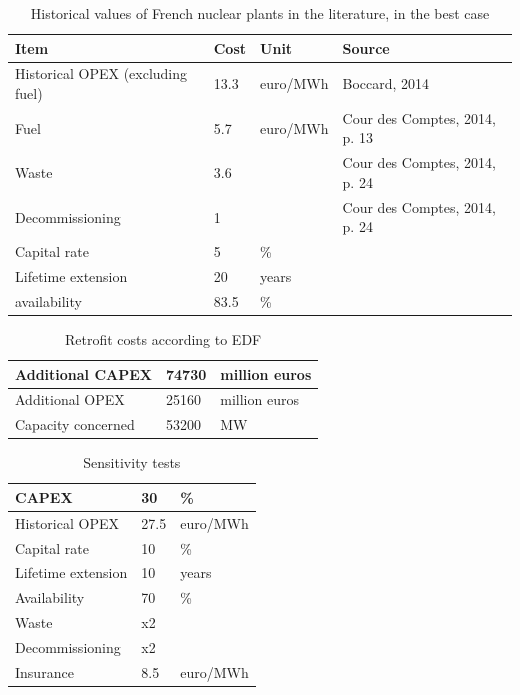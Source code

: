 \begin{table}[!htp]
	\centering
	\caption{Historical values of French nuclear plants in the literature, in the best case}
	\label{tab:historical_costs}
	\begin{tabular}{llll}
		\toprule
		Item & Cost & Unit & Source \\
		\midrule
		Historical OPEX (excluding fuel) & 13.3 & euro/MWh & Boccard, 2014 \\
		Fuel & 5.7 & euro/MWh & Cour des Comptes, 2014, p. 13 \\
		Waste & 3.6 &  & Cour des Comptes, 2014, p. 24 \\
		Decommissioning & 1 &  & Cour des Comptes, 2014, p. 24 \\
		Capital rate & 5 & \% &  \\
		Lifetime extension & 20 & years & \\
		availability & 83.5 & \% & \\
		\bottomrule
	\end{tabular}
\end{table}


\begin{table}[!htp]
	\centering
	\caption{Retrofit costs according to EDF}
	\label{tab:costs_grand_carenage}
	\begin{tabular}{lll}
		\toprule
		Additional CAPEX & 74730 & million euros \\
		\midrule
		Additional OPEX & 25160 & million euros \\
		Capacity concerned & 53200 & MW \\
		\bottomrule
	\end{tabular}
\end{table}


\begin{table}[!htp]
	\centering
	\caption{Sensitivity tests}
	\label{tab:sensitivity_tests}
	\begin{tabular}{lll}
		\toprule
		CAPEX & 30 & \% \\
		\midrule
		Historical OPEX & 27.5 & euro/MWh \\
		Capital rate & 10 & \% \\
		Lifetime extension & 10 & years \\
		Availability & 70 & \% \\
		Waste & x2 &  \\
		Decommissioning & x2 &  \\
		Insurance & 8.5 & euro/MWh \\
		\bottomrule
	\end{tabular}
\end{table}

